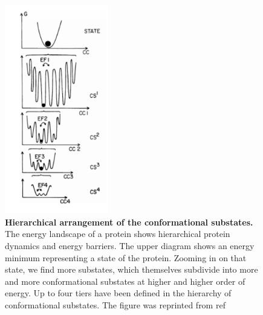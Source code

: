 \begin{figure} %
    \centering
    \includegraphics[width=0.4\textwidth]{energy_landscape}
    \caption{\textbf{Hierarchical arrangement of the conformational substates.} The energy landscape of a protein shows hierarchical protein dynamics and energy barriers. The upper diagram shows an energy minimum representing a state of the protein. Zooming in on that state, we find more substates, which themselves subdivide into more and more conformational substates at higher and higher order of energy. Up to four tiers have been defined in the hierarchy of conformational substates. The figure was reprinted from ref \cite{ansari1985protein}}
    \label{fig:energy_landscape}
\end{figure}

